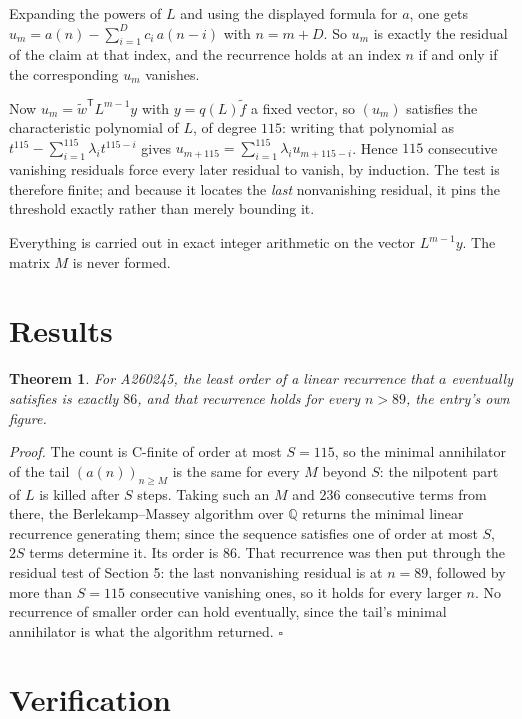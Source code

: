 \documentclass[11pt]{article}
\newtheorem{theorem}{Theorem}
\theoremstyle{definition}
\begin{document}
Expanding the powers of $L$ and using the displayed formula for $a$, one gets $u_m = a(n) - \sum_{i=1}^{D} c_i\,a(n-i)$ with $n = m + D$. So $u_m$ is exactly the residual of the claim at that index, and the recurrence holds at an index $n$ if and only if the corresponding $u_m$ vanishes.

Now $u_m = \tilde w^{\mathsf T} L^{m-1} y$ with $y = q(L)\tilde f$ a fixed vector, so $(u_m)$ satisfies the characteristic polynomial of $L$, of degree $115$: writing that polynomial as $t^{115} - \sum_{i=1}^{115} \lambda_i t^{115-i}$ gives $u_{m+115} = \sum_{i=1}^{115} \lambda_i u_{m+115-i}$. Hence $115$ consecutive vanishing residuals force every later residual to vanish, by induction. The test is therefore finite; and because it locates the {\itshape last} nonvanishing residual, it pins the threshold exactly rather than merely bounding it.

Everything is carried out in exact integer arithmetic on the vector $L^{m-1}y$. The matrix $M$ is never formed.

\section{Results}

\begin{theorem} For A260245, the least order of a linear recurrence that $a$ eventually satisfies is exactly $86$, and that recurrence holds for every $n > 89$, the entry's own figure.\end{theorem}

{\itshape Proof.} The count is C-finite of order at most $S = 115$, so the minimal annihilator of the tail $(a(n))_{n \ge M}$ is the same for every $M$ beyond $S$: the nilpotent part of $L$ is killed after $S$ steps. Taking such an $M$ and $236$ consecutive terms from there, the Berlekamp--Massey algorithm over $\mathbb{Q}$ returns the minimal linear recurrence generating them; since the sequence satisfies one of order at most $S$, $2S$ terms determine it. Its order is $86$. That recurrence was then put through the residual test of Section 5: the last nonvanishing residual is at $n = 89$, followed by more than $S = 115$ consecutive vanishing ones, so it holds for every larger $n$. No recurrence of smaller order can hold eventually, since the tail's minimal annihilator is what the algorithm returned. $\square$

\section{Verification}
\end{document}
